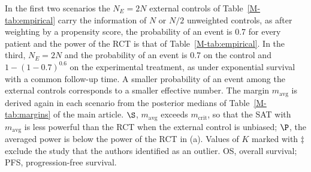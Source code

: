 \begin{table}[!htb]
\begin{minipage}{0.95\linewidth}
In the first two scenarios the $N_E = 2N$ external controls of Table~\ref{M-tab:empirical} carry the information of $N$ or $N/2$ unweighted controls, as after weighting by a propensity score, the probability of an event is 0.7 for every patient and the power of the RCT is that of Table~\ref{M-tab:empirical}. In the third, $N_E = 2N$ and the probability of an event is 0.7 on the control and $1 - (1 - 0.7)^{0.6}$ on the experimental treatment, as under exponential survival with a common follow-up time. A smaller probability of an event among the external controls corresponds to a smaller effective number. The margin $m_{\mathrm{avg}}$ is derived again in each scenario from the posterior medians of Table~\ref{M-tab:margins} of the main article. $\S$, $m_{\mathrm{avg}}$ exceeds $m_{\mathrm{crit}}$, so that the SAT with $m_{\mathrm{avg}}$ is less powerful than the RCT when the external control is unbiased; $\P$, the averaged power is below the power of the RCT in (a). Values of $K$ marked with $\ddagger$ exclude the study that the authors identified as an outlier. OS, overall survival; PFS, progression-free survival.
\end{minipage}
\end{table}
